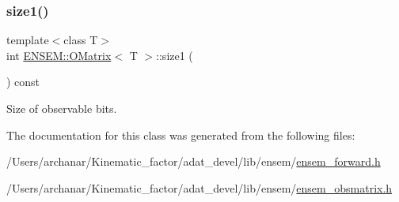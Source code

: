 \subsubsection{\texorpdfstring{size1()}{size1()}\hspace{0.1cm}{\footnotesize\ttfamily [2/2]}}
{\footnotesize\ttfamily template$<$class T$>$ \\
int \mbox{\hyperlink{classENSEM_1_1OMatrix}{E\+N\+S\+E\+M\+::\+O\+Matrix}}$<$ T $>$\+::size1 (\begin{DoxyParamCaption}{ }\end{DoxyParamCaption}) const\hspace{0.3cm}{\ttfamily [inline]}}



Size of observable bits. 



The documentation for this class was generated from the following files\+:\begin{DoxyCompactItemize}
\item 
/\+Users/archanar/\+Kinematic\+\_\+factor/adat\+\_\+devel/lib/ensem/\mbox{\hyperlink{lib_2ensem_2ensem__forward_8h}{ensem\+\_\+forward.\+h}}\item 
/\+Users/archanar/\+Kinematic\+\_\+factor/adat\+\_\+devel/lib/ensem/\mbox{\hyperlink{lib_2ensem_2ensem__obsmatrix_8h}{ensem\+\_\+obsmatrix.\+h}}\end{DoxyCompactItemize}
